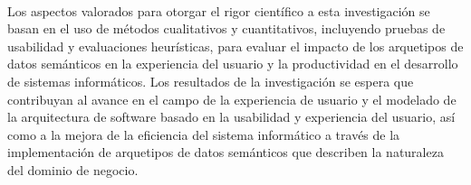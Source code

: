 \documentclass[12pt,a4paper]{article}
\begin{document}
\\
Los aspectos valorados para otorgar el rigor científico a esta investigación se basan en el uso de métodos cualitativos y cuantitativos, incluyendo pruebas de usabilidad y evaluaciones heurísticas, para evaluar el impacto de los arquetipos de datos semánticos en la experiencia del usuario y la productividad en el desarrollo de sistemas informáticos. Los resultados de la investigación se espera que contribuyan al avance en el campo de la experiencia de usuario y el modelado de la arquitectura de software basado en la usabilidad y experiencia del usuario, así como a la mejora de la eficiencia del sistema informático a través de la implementación de arquetipos de datos semánticos que describen la naturaleza del dominio de negocio. 
\\
\end{document}
